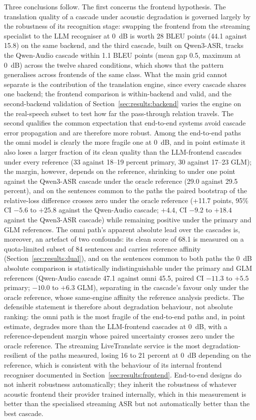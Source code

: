 Three conclusions follow. The first concerns the frontend hypothesis. The
translation quality of a cascade under acoustic degradation is governed
largely by the robustness of its recognition stage: swapping the
frontend from the streaming specialist to the LLM recogniser at 0~dB is
worth 28 BLEU points (44.1 against 15.8) on the same backend, and the third cascade, built on
Qwen3-ASR, tracks the Qwen-Audio cascade within 1.1 BLEU points (mean gap
0.5, maximum at 0~dB) across the twelve
shared conditions, which shows that the pattern generalises across
frontends of the same class. What the main grid cannot separate is the
contribution of the translation engine, since every cascade shares one
backend; the frontend comparison is within-backend and valid, and the
second-backend validation of Section~\ref{sec:results:backend} varies the
engine on the real-speech subset to test how far the pass-through relation
travels. The second qualifies the common expectation that end-to-end
systems avoid cascade error propagation and are therefore more robust.
Among the end-to-end paths the omni model is clearly the more fragile
one at 0~dB, and in point estimate it also loses a larger fraction of its
clean quality than the LLM-frontend cascades under every reference (33
against 18--19 percent primary, 30 against 17--23 GLM); the margin,
however, depends on the reference, shrinking to under one point against
the Qwen3-ASR cascade under the oracle reference (29.0 against 29.5
percent), and on the sentences common to the paths the paired bootstrap of
the relative-loss difference crosses zero under the oracle reference
(+11.7 points, 95\% CI $-5.6$ to $+25.8$ against the Qwen-Audio cascade;
$+4.4$, CI $-9.2$ to $+18.4$ against the Qwen3-ASR cascade) while
remaining positive under the primary and GLM references. The omni path's
apparent absolute lead over the cascades is, moreover, an artefact of two
confounds: its clean score of 68.1 is measured on a quota-limited subset
of 84 sentences and carries reference affinity
(Section~\ref{sec:results:dual}), and on the sentences common to both
paths the 0~dB absolute comparison is statistically indistinguishable
under the primary and GLM references (Qwen-Audio cascade 47.1 against
omni 45.5, paired CI $-11.3$ to $+5.5$ primary; $-10.0$ to $+6.3$ GLM),
separating in the cascade's favour only under the oracle reference, whose
same-engine affinity the reference analysis predicts. The defensible
statement is therefore about degradation behaviour, not absolute ranking:
the omni path is the most fragile of the end-to-end paths and, in point
estimate, degrades more than the LLM-frontend cascades at 0~dB, with a
reference-dependent margin whose paired uncertainty crosses zero under
the oracle reference. The streaming
LiveTranslate service is the most degradation-resilient of the paths
measured, losing 16 to 21 percent at 0~dB depending on the reference,
which is consistent with the behaviour of its
internal frontend recogniser documented in
Section~\ref{sec:results:frontend}. End-to-end designs do not inherit
robustness automatically; they inherit the robustness of whatever acoustic
frontend their provider trained internally, which in this measurement is
better than the specialised streaming ASR but not automatically better
than the best cascade.


